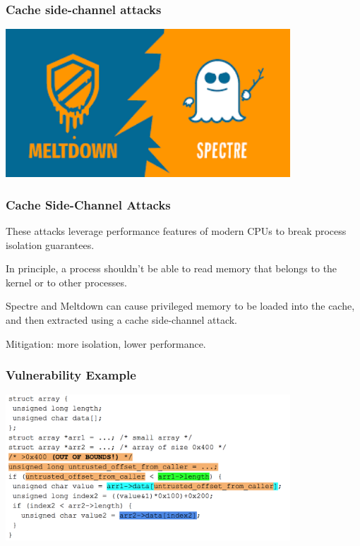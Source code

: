 \begin{frame}
\frametitle{Cache side-channel attacks}

\begin{center}
\includegraphics[width=0.8\textwidth]{images/meltdown-spectre.png}
\end{center}


\end{frame}

\begin{frame}
\frametitle{Cache Side-Channel Attacks}

These attacks leverage performance features of modern CPUs to break process isolation guarantees.

In principle, a process shouldn't be able to read memory that belongs to the kernel or to other processes.

Spectre and Meltdown can cause privileged memory to be loaded into the cache, and then extracted using a cache side-channel attack.

Mitigation: more isolation, lower performance.

\end{frame}



\begin{frame}
\frametitle{Vulnerability Example}

\begin{center}
\includegraphics[width=0.8\textwidth]{images/cache-sidechannel1.png}
\end{center}


\end{frame}

